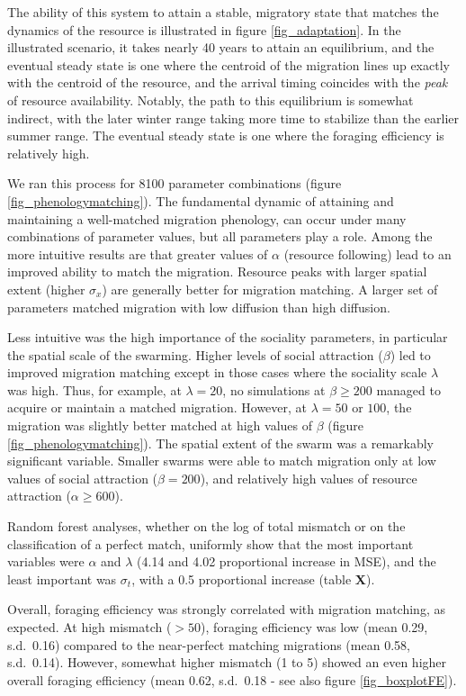 \documentclass[utf8]{frontiersSCNS} %
\begin{document}
	The ability of this system to attain a stable, migratory state that matches the dynamics of the resource is illustrated in figure \ref{fig_adaptation}. In the illustrated scenario, it takes nearly 40 years to attain an equilibrium, and the eventual steady state is one where the centroid of the migration lines up exactly with the centroid of the resource, and the arrival timing coincides with the \emph{peak} of resource availability. Notably, the path to this equilibrium is somewhat indirect, with the later winter range taking more time to stabilize than the earlier summer range. The eventual steady state is one where the foraging efficiency is relatively high.
	
	We ran this process for 8100 parameter combinations (figure \ref{fig_phenologymatching}). The fundamental dynamic of attaining and maintaining a well-matched migration phenology, can occur under many combinations of parameter values, but all parameters play a role. Among the more intuitive results are that greater values of $\alpha$ (resource following) lead to an improved ability to match the migration. Resource peaks with larger spatial extent (higher $\sigma_x$) are generally better for migration matching. A larger set of parameters matched migration with low diffusion than high diffusion.
	
	Less intuitive was the high importance of the sociality parameters, in particular the spatial scale of the swarming. Higher levels of social attraction ($\beta$) led to improved migration matching except in those cases where the sociality scale $\lambda$ was high. Thus, for example, at $\lambda = 20$, no simulations at $\beta \geq 200$ managed to acquire or maintain a matched migration. However, at $\lambda = 50$ or $100$, the migration was slightly better matched at high values of $\beta$ (figure \ref{fig_phenologymatching}). The spatial extent of the swarm was a remarkably significant variable. Smaller swarms were able to match migration only at low values of social attraction ($\beta = 200$), and relatively high values of resource attraction ($\alpha \geq 600$).
	
	Random forest analyses, whether on the log of total mismatch or on the classification of a perfect match, uniformly show that the most important variables \citep{Breiman2001} were $\alpha$ and $\lambda$ (4.14 and 4.02 proportional increase in MSE), and the least important was $\sigma_t$, with a 0.5 proportional increase (table \textbf{X}).
	
	Overall, foraging efficiency was strongly correlated with migration matching, as expected. At high mismatch ($>50$), foraging efficiency was low (mean 0.29, s.d.~0.16) compared to the near-perfect matching migrations (mean 0.58, s.d.~0.14). However, somewhat higher mismatch (1 to 5) showed an even higher overall foraging efficiency (mean 0.62, s.d.~0.18 - see also figure \ref{fig_boxplotFE}).
	
\end{document}
